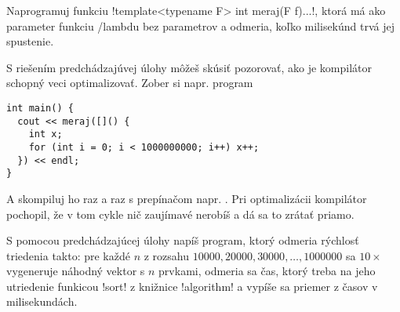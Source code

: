 \begin{uloha}
  Naprogramuj funkciu \prg!template<typename F> int meraj(F f){...}!, ktorá
  má ako parameter funkciu /lambdu bez parametrov a odmeria, koľko milisekúnd trvá
  jej spustenie.
\end{uloha}


S riešením predchádzajúvej úlohy
môžeš skúsiť pozorovať, ako je kompilátor schopný veci optimalizovať. 
Zober si napr. program

\begin{lstlisting}
int main() {
  cout << meraj([]() {
    int x;
    for (int i = 0; i < 1000000000; i++) x++;
  }) << endl;
}
\end{lstlisting}

A skompiluj ho raz  a raz s prepínačom  napr.
. Pri optimalizácii kompilátor pochopil, že v tom cykle
nič zaujímavé nerobíš a dá sa to zrátať priamo.

\begin{uloha}
S pomocou predchádzajúcej úlohy napíš program, ktorý odmeria rýchlosť triedenia takto:
pre každé $n$ z rozsahu $10000,20000,30000,\ldots,1000000$ sa $10\times$ vygeneruje
náhodný vektor s $n$ prvkami, odmeria sa čas, ktorý treba na jeho utriedenie
  funkicou \prg!sort! z knižnice \prg!algorithm! a vypíše sa priemer z 
  časov v milisekundách.
\end{uloha}

